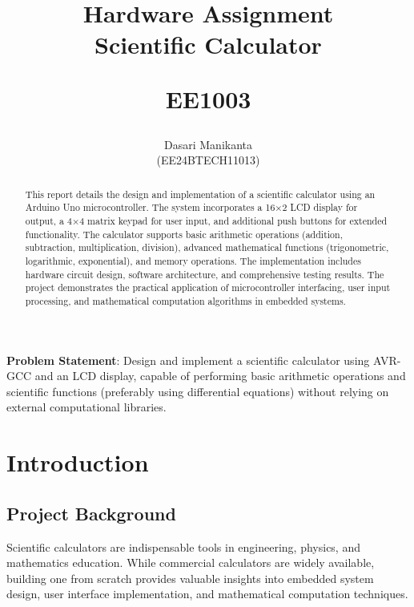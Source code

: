 \documentclass[journal]{IEEEtran}
\begin{document}
\title{
Hardware Assignment \\ Scientific Calculator

\large{EE1003}
}

\author{Dasari Manikanta \\(EE24BTECH11013)}

\maketitle

\bigskip

\textbf{Problem Statement}: Design and implement a scientific calculator using AVR-GCC and an LCD display, capable of performing basic arithmetic operations and scientific functions (preferably using differential equations) without relying on external computational libraries.



\begin{abstract}
This report details the design and implementation of a scientific calculator using an Arduino Uno microcontroller. The system incorporates a 16×2 LCD display for output, a 4×4 matrix keypad for user input, and additional push buttons for extended functionality. The calculator supports basic arithmetic operations (addition, subtraction, multiplication, division), advanced mathematical functions (trigonometric, logarithmic, exponential), and memory operations. The implementation includes hardware circuit design, software architecture, and comprehensive testing results. The project demonstrates the practical application of microcontroller interfacing, user input processing, and mathematical computation algorithms in embedded systems.
\end{abstract}

\section{Introduction}
\subsection{Project Background}
Scientific calculators are indispensable tools in engineering, physics, and mathematics education. While commercial calculators are widely available, building one from scratch provides valuable insights into embedded system design, user interface implementation, and mathematical computation techniques.
\end{document}

